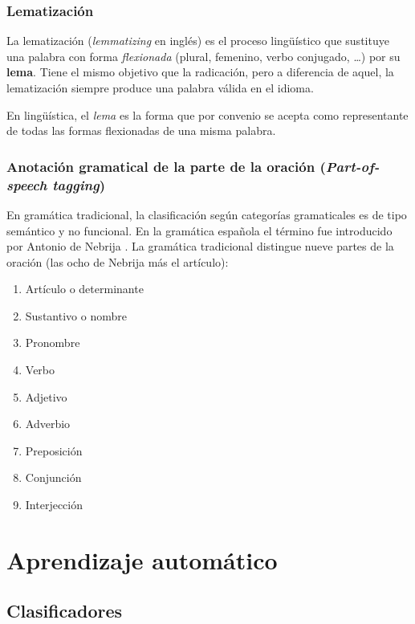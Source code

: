 \subsection{Lematización}

La lematización (\emph{lemmatizing} en inglés) es el proceso lingüístico que sustituye una palabra con forma \emph{flexionada} (plural, femenino, verbo conjugado, \ldots) por su \textbf{lema}. Tiene el mismo objetivo que la radicación, pero a diferencia de aquel, la lematización siempre produce una palabra válida en el idioma.
\begin{definition}[Lema]
En lingüística, el \emph{lema} es la forma que por convenio se acepta como representante de todas las formas flexionadas de una misma palabra.
\end{definition}

\subsection{Anotación gramatical de la parte de la oración (\emph{Part-of-speech tagging}) }

En gramática tradicional, la clasificación según categorías gramaticales es de tipo semántico y no funcional. En la gramática española el término fue introducido por Antonio de Nebrija \citep[Categoría gramatical]{wikipedia-es}. La gramática tradicional distingue nueve partes de la oración (las ocho de Nebrija más el artículo):
\nopagebreak
\begin{enumerate}
\item Artículo o determinante
\item Sustantivo o nombre
\item Pronombre
\item Verbo
\item Adjetivo
\item Adverbio
\item Preposición
\item Conjunción
\item Interjección
\end{enumerate}

\chapter{Aprendizaje automático}

\section{Clasificadores}

